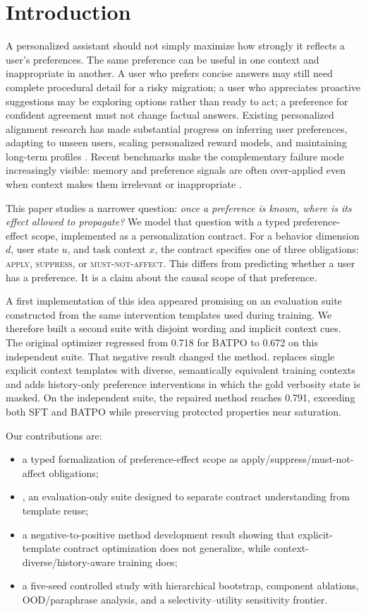 \section{Introduction}
A personalized assistant should not simply maximize how strongly it reflects a user's preferences. The same preference can be useful in one context and inappropriate in another. A user who prefers concise answers may still need complete procedural detail for a risky migration; a user who appreciates proactive suggestions may be exploring options rather than ready to act; a preference for confident agreement must not change factual answers. Existing personalized alignment research has made substantial progress on inferring user preferences, adapting to unseen users, scaling personalized reward models, and maintaining long-term profiles \citep{prlhf,nextquill,pgenrm,alignx,personalagent,mipo}. Recent benchmarks make the complementary failure mode increasingly visible: memory and preference signals are often over-applied even when context makes them irrelevant or inappropriate \citep{benchpres,rpeval,opbench}.

This paper studies a narrower question: \emph{once a preference is known, where is its effect allowed to propagate?} We model that question with a typed preference-effect scope, implemented as a personalization contract. For a behavior dimension $d$, user state $u$, and task context $x$, the contract specifies one of three obligations: \textsc{apply}, \textsc{suppress}, or \textsc{must-not-affect}. This differs from predicting whether a user has a preference. It is a claim about the causal scope of that preference.

A first implementation of this idea appeared promising on an evaluation suite constructed from the same intervention templates used during training. We therefore built a second suite with disjoint wording and implicit context cues. The original optimizer regressed from 0.718 for BATPO to 0.672 on this independent suite. That negative result changed the method. \method{} replaces single explicit context templates with diverse, semantically equivalent training contexts and adds history-only preference interventions in which the gold verbosity state is masked. On the independent suite, the repaired method reaches 0.791, exceeding both SFT and BATPO while preserving protected properties near saturation.

Our contributions are:
\begin{itemize}
  \item a typed formalization of preference-effect scope as apply/suppress/must-not-affect obligations;
  \item \bench{}, an evaluation-only suite designed to separate contract understanding from template reuse;
  \item a negative-to-positive method development result showing that explicit-template contract optimization does not generalize, while context-diverse/history-aware training does;
  \item a five-seed controlled study with hierarchical bootstrap, component ablations, OOD/paraphrase analysis, and a selectivity--utility sensitivity frontier.
\end{itemize}

